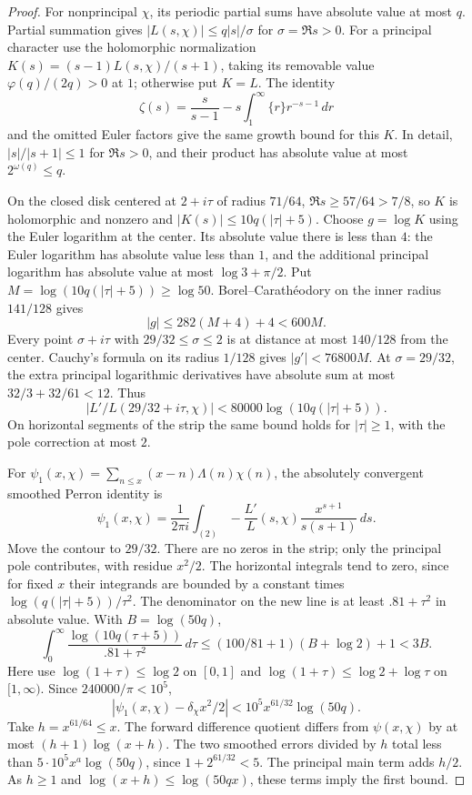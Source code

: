 \documentclass[11pt]{article}
\theoremstyle{remark}\newtheorem{remark}[theorem]{Remark}
\begin{document}
\begin{proof}
For nonprincipal $\chi$, its periodic partial sums have absolute value
at most $q$. Partial summation gives
$|L(s,\chi)|\le q|s|/\sigma$ for $\sigma=\Re s>0$.
For a principal character use the holomorphic normalization
$K(s)=(s-1)L(s,\chi)/(s+1)$, taking its removable value
$\varphi(q)/(2q)>0$ at $1$; otherwise put $K=L$.
The identity
\[
\zeta(s)=\frac{s}{s-1}-s\int_1^\infty\{r\}r^{-s-1}\,dr
\]
and the omitted Euler factors give the same growth bound for this $K$.
In detail, $|s|/|s+1|\le1$ for $\Re s>0$,
and their product has absolute value at most $2^{\omega(q)}\le q$.

On the closed disk centered at $2+i\tau$ of radius $71/64$,
$\Re s\ge57/64>7/8$, so $K$ is holomorphic and nonzero and
$|K(s)|\le10q(|\tau|+5)$. Choose $g=\log K$ using the Euler logarithm
at the center. Its absolute value there is less than $4$: the Euler
logarithm has absolute value less than $1$, and the additional principal
logarithm has absolute value at most $\log3+\pi/2$.
Put $M=\log(10q(|\tau|+5))\ge\log50$.
Borel--Carath\'eodory on the inner radius $141/128$ gives
\[
|g|\le282(M+4)+4<600M.
\]
Every point $\sigma+i\tau$ with $29/32\le\sigma\le2$ is at distance
at most $140/128$ from the center. Cauchy's formula on its radius
$1/128$ gives $|g'|<76800M$.
At $\sigma=29/32$, the extra principal logarithmic derivatives have
absolute sum at most $32/3+32/61<12$. Thus
\[
|L'/L(29/32+i\tau,\chi)|<80000\log(10q(|\tau|+5)).
\]
On horizontal segments of the strip the same bound holds for
$|\tau|\ge1$, with the pole correction at most $2$.

For $\psi_1(x,\chi)=\sum_{n\le x}(x-n)\Lambda(n)\chi(n)$,
the absolutely convergent smoothed Perron identity is
\[
\psi_1(x,\chi)=\frac1{2\pi i}\int_{(2)}
-\frac{L'}L(s,\chi)\frac{x^{s+1}}{s(s+1)}\,ds.
\]
Move the contour to $29/32$. There are no zeros in the strip;
only the principal pole contributes, with residue $x^2/2$.
The horizontal integrals tend to zero, since for fixed $x$ their
integrands are bounded by a constant times $\log(q(|\tau|+5))/\tau^2$.
The denominator on the new line is at least $.81+\tau^2$ in absolute
value. With $B=\log(50q)$,
\[
\int_0^\infty\frac{\log(10q(\tau+5))}{.81+\tau^2}\,d\tau
\le(100/81+1)(B+\log2)+1<3B.
\]
Here use $\log(1+\tau)\le\log2$ on $[0,1]$ and
$\log(1+\tau)\le\log2+\log\tau$ on $[1,\infty)$.
Since $240000/\pi<10^5$,
\[
|\psi_1(x,\chi)-\delta_\chi x^2/2|<10^5x^{61/32}\log(50q).
\]
Take $h=x^{61/64}\le x$. The forward difference quotient differs
from $\psi(x,\chi)$ by at most $(h+1)\log(x+h)$.
The two smoothed errors divided by $h$ total less than
$5\cdot10^5x^a\log(50q)$, since $1+2^{61/32}<5$.
The principal main term adds $h/2$. As $h\ge1$ and
$\log(x+h)\le\log(50qx)$, these terms imply the first bound.


\end{proof}
\end{document}
